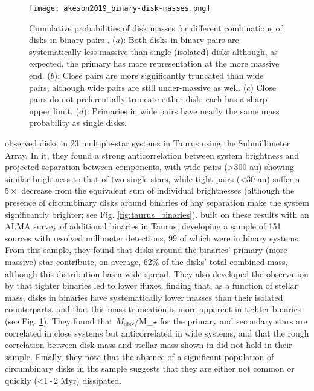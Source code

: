 \begin{figure}[h]
  \texttt{[image: akeson2019\_binary-disk-masses.png]}%
  \caption{Cumulative probabilities of disk masses for different combinations of disks in binary pairs \citep{Akeson2019}. ($a$): Both disks in binary pairs are systematically less massive than single (isolated) disks although, as expected, the primary has more representation at the more massive end. ($b$): Close pairs are more significantly truncated than wide pairs, although wide pairs are still under-massive as well. ($c$) Close pairs do not preferentially truncate either disk; each has a sharp upper limit. ($d$): Primaries in wide pairs have nearly the same mass probability as single disks.}
  \label{fig:binary_disk_masses}
\end{figure}


\citet{Harris2012} observed disks in 23 multiple-star systems in Taurus using the Submillimeter Array. In it, they found a strong anticorrelation between system brightness and projected separation between components, with wide pairs (\textgreater300 au) showing similar brightness to that of two single stars, while tight pairs (\textless30 au) suffer a $5\times$ decrease from the equivalent sum of individual brightnesses (although the presence of circumbinary disks around binaries of any separation make the system significantly brighter; see Fig. \ref{fig:taurus_binaries}). \citet{Akeson2019} built on these results with an ALMA survey of additional binaries in Taurus, developing a sample of 151 sources with resolved millimeter detections, 99 of which were in binary systems. From this sample, they found that disks around the binaries' primary (more massive) star contribute, on average, 62\% of the disks' total combined mass, although this distribution has a wide spread. They also developed the observation by \citet{Harris2012} \citep[and previously in][]{Jensen1996} that tighter binaries led to lower fluxes, finding that, as a function of stellar mass, disks in binaries have systematically lower masses than their isolated counterparts, and that this mass truncation is more apparent in tighter binaries (see Fig. \ref{fig:binary_disk_masses}). They found that $M_\text{disk}$/M_$\star$ for the primary and secondary stars are correlated in close systems but anticorrelated in wide systems, and that the rough correlation between disk mass and stellar mass shown in \citet{Andrews2013} did not hold in their sample. Finally, they note that the absence of a significant population of circumbinary disks in the sample suggests that they are either not common or quickly (\textless1\,-\,2 Myr) dissipated.


